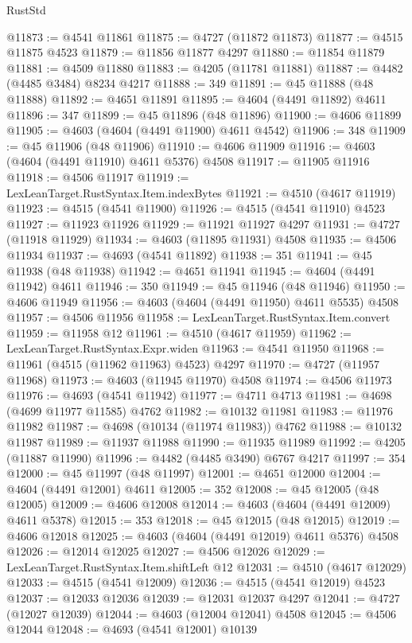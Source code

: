 \begin{lexlean}{RustStd}
\begin{coremodule}
@11873 := @4541 @11861
@11875 := @4727 (@11872 @11873)
@11877 := @4515 @11875 @4523
@11879 := @11856 @11877 @4297
@11880 := @11854 @11879
@11881 := @4509 @11880
@11883 := @4205 (@11781 @11881)
@11887 := @4482 (@4485 @3484) @8234 @4217
@11888 := 349
@11891 := @45 @11888 (@48 @11888)
@11892 := @4651 @11891
@11895 := @4604 (@4491 @11892) @4611
@11896 := 347
@11899 := @45 @11896 (@48 @11896)
@11900 := @4606 @11899
@11905 := @4603 (@4604 (@4491 @11900) @4611 @4542)
@11906 := 348
@11909 := @45 @11906 (@48 @11906)
@11910 := @4606 @11909
@11916 := @4603 (@4604 (@4491 @11910) @4611 @5376) @4508
@11917 := @11905 @11916
@11918 := @4506 @11917
@11919 := LexLeanTarget.RustSyntax.Item.indexBytes
@11921 := @4510 (@4617 @11919)
@11923 := @4515 (@4541 @11900)
@11926 := @4515 (@4541 @11910) @4523
@11927 := @11923 @11926
@11929 := @11921 @11927 @4297
@11931 := @4727 (@11918 @11929)
@11934 := @4603 (@11895 @11931) @4508
@11935 := @4506 @11934
@11937 := @4693 (@4541 @11892)
@11938 := 351
@11941 := @45 @11938 (@48 @11938)
@11942 := @4651 @11941
@11945 := @4604 (@4491 @11942) @4611
@11946 := 350
@11949 := @45 @11946 (@48 @11946)
@11950 := @4606 @11949
@11956 := @4603 (@4604 (@4491 @11950) @4611 @5535) @4508
@11957 := @4506 @11956
@11958 := LexLeanTarget.RustSyntax.Item.convert
@11959 := @11958 @12
@11961 := @4510 (@4617 @11959)
@11962 := LexLeanTarget.RustSyntax.Expr.widen
@11963 := @4541 @11950
@11968 := @11961 (@4515 (@11962 @11963) @4523) @4297
@11970 := @4727 (@11957 @11968)
@11973 := @4603 (@11945 @11970) @4508
@11974 := @4506 @11973
@11976 := @4693 (@4541 @11942)
@11977 := @4711 @4713
@11981 := @4698 (@4699 @11977 @11585) @4762
@11982 := @10132 @11981
@11983 := @11976 @11982
@11987 := @4698 (@10134 (@11974 @11983)) @4762
@11988 := @10132 @11987
@11989 := @11937 @11988
@11990 := @11935 @11989
@11992 := @4205 (@11887 @11990)
@11996 := @4482 (@4485 @3490) @6767 @4217
@11997 := 354
@12000 := @45 @11997 (@48 @11997)
@12001 := @4651 @12000
@12004 := @4604 (@4491 @12001) @4611
@12005 := 352
@12008 := @45 @12005 (@48 @12005)
@12009 := @4606 @12008
@12014 := @4603 (@4604 (@4491 @12009) @4611 @5378)
@12015 := 353
@12018 := @45 @12015 (@48 @12015)
@12019 := @4606 @12018
@12025 := @4603 (@4604 (@4491 @12019) @4611 @5376) @4508
@12026 := @12014 @12025
@12027 := @4506 @12026
@12029 := LexLeanTarget.RustSyntax.Item.shiftLeft @12
@12031 := @4510 (@4617 @12029)
@12033 := @4515 (@4541 @12009)
@12036 := @4515 (@4541 @12019) @4523
@12037 := @12033 @12036
@12039 := @12031 @12037 @4297
@12041 := @4727 (@12027 @12039)
@12044 := @4603 (@12004 @12041) @4508
@12045 := @4506 @12044
@12048 := @4693 (@4541 @12001) @10139

\end{coremodule}
\end{lexlean}
